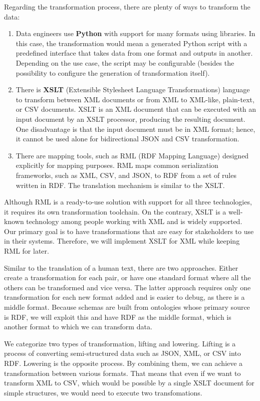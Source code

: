 Regarding the transformation process, there are plenty of ways to transform the data:
\begin{enumerate}
    \item Data engineers use \textbf{Python} with support for many formats using libraries. In this case, the transformation would mean a generated Python script with a predefined interface that takes data from one format and outputs in another. Depending on the use case, the script may be configurable (besides the possibility to configure the generation of transformation itself).
    \item There is \textbf{XSLT} (Extensible Stylesheet Language Transformations) language to transform between XML documents or from XML to XML-like, plain-text, or CSV documents. XSLT is an XML document that can be executed with an input document by an XSLT processor, producing the resulting document. One disadvantage is that the input document must be in XML format; hence, it cannot be used alone for bidirectional JSON and CSV transformation.
    \item There are mapping tools, such as RML \cite{dimou2014rml} (RDF Mapping Language) designed explicitly for mapping purposes. RML maps common serialization frameworks, such as XML, CSV, and JSON, to RDF from a set of rules written in RDF. The translation mechanism is similar to the XSLT.
\end{enumerate}

Although RML is a ready-to-use solution with support for all three technologies, it requires its own transformation toolchain. On the contrary, XSLT is a well-known technology among people working with XML and is widely supported. Our primary goal is to have transformations that are easy for stakeholders to use in their systems. Therefore, we will implement XSLT for XML while keeping RML for later.

Similar to the translation of a human text, there are two approaches. Either create a transformation for each pair, or have one standard format where all the others can be transformed and vice versa. The latter approach requires only one transformation for each new format added and is easier to debug, as there is a middle format. Because schemas are built from ontologies whose primary source is RDF, we will exploit this and have RDF as the middle format, which is another format to which we can transform data.

\medskip

We categorize two types of transformation, lifting and lowering. Lifting is a process of converting semi-structured data such as JSON, XML, or CSV into RDF. Lowering is the opposite process. By combining them, we can achieve a transformation between various formats. That means that even if we want to transform XML to CSV, which would be possible by a single XSLT document for simple structures, we would need to execute two transfomations.

